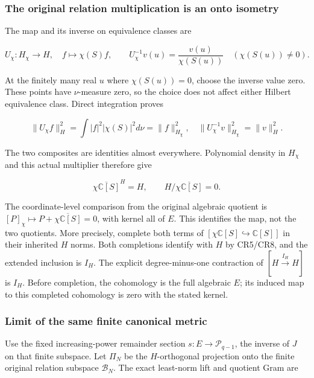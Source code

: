 \subsubsection{The original relation multiplication is an onto isometry}\label{the-original-relation-multiplication-is-an-onto-isometry}

The map and its inverse on equivalence classes are

\[
U_\chi:H_\chi\longrightarrow H,\quad f\longmapsto\chi(S)f,
\qquad
U_\chi^{-1}v(u)=\frac{v(u)}{\chi(S(u))}\quad(\chi(S(u))\ne0).
\tag{CR6}
\]

At the finitely many real \(u\) where \(\chi(S(u))=0\), choose the inverse value zero. These points have \(\nu\)-measure zero, so the choice does not affect either Hilbert equivalence class. Direct integration proves

\[
\|U_\chi f\|_H^2=\int|f|^2|\chi(S)|^2d\nu=\|f\|_{H_\chi}^2,
\quad
\|U_\chi^{-1}v\|_{H_\chi}^2=\|v\|_H^2.
\tag{CR7}
\]

The two composites are identities almost everywhere. Polynomial density in \(H_\chi\) and this actual multiplier therefore give

\[
\boxed{\overline{\chi\mathbb C[S]}^{H}=H,
\qquad H/\overline{\chi\mathbb C[S]}=0.}
\tag{CR8}
\]

The coordinate-level comparison from the original algebraic quotient is \([P]_\chi\mapsto P+\overline{\chi\mathbb C[S]}=0\), with kernel all of \(E\). This identifies the map, not the two quotients. More precisely, complete both terms of \([\chi\mathbb C[S]\hookrightarrow\mathbb C[S]]\) in their inherited \(H\) norms. Both completions identify with \(H\) by CR5/CR8, and the extended inclusion is \(I_H\). The explicit degree-minus-one contraction of \([H\xrightarrow{I_H}H]\) is \(I_H\). Before completion, the cohomology is the full algebraic \(E\); its induced map to this completed cohomology is zero with the stated kernel.

\subsubsection{Limit of the same finite canonical metric}\label{limit-of-the-same-finite-canonical-metric}

Use the fixed increasing-power remainder section \(s:E\to\mathcal P_{q-1}\), the inverse of \(J\) on that finite subspace. Let \(\Pi_N\) be the \(H\)-orthogonal projection onto the finite original relation subspace \(\mathcal B_N\). The exact least-norm lift and quotient Gram are

